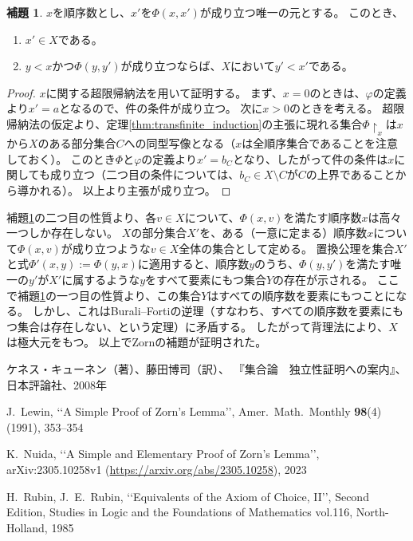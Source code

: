 ﻿\documentclass{ltjsarticle}
\theoremstyle{definition}
\newtheorem{lemma}{補題}
\begin{document}
\begin{lemma}
    \label{lem:appendix_property_of_Phi}
    $x$を順序数とし、$x'$を$\Phi(x,x')$が成り立つ唯一の元とする。
    このとき、
    \begin{enumerate}
        \item $x' \in X$である。
        \item $y < x$かつ$\Phi(y,y')$が成り立つならば、$X$において$y' < x'$である。
    \end{enumerate}
\end{lemma}
\begin{proof}
    $x$に関する超限帰納法を用いて証明する。
    まず、$x = 0$のときは、$\varphi$の定義より$x' = a$となるので、件の条件が成り立つ。
    次に$x > 0$のときを考える。
    超限帰納法の仮定より、定理\ref{thm:transfinite_induction}の主張に現れる集合$\Phi\!\upharpoonright_x$は$x$から$X$のある部分集合$C$への同型写像となる（$x$は全順序集合であることを注意しておく）。
    このとき$\Phi$と$\varphi$の定義より$x' = b_C$となり、したがって件の条件は$x$に関しても成り立つ（二つ目の条件については、$b_C \in X \setminus C$が$C$の上界であることから導かれる）。
    以上より主張が成り立つ。
\end{proof}

補題\ref{lem:appendix_property_of_Phi}の二つ目の性質より、各$v \in X$について、$\Phi(x,v)$を満たす順序数$x$は高々一つしか存在しない。
$X$の部分集合$X'$を、ある（一意に定まる）順序数$x$について$\Phi(x,v)$が成り立つような$v \in X$全体の集合として定める。
置換公理を集合$X'$と式$\Phi'(x,y) := \Phi(y,x)$に適用すると、順序数$y$のうち、$\Phi(y,y')$を満たす唯一の$y'$が$X'$に属するような$y$をすべて要素にもつ集合$Y$の存在が示される。
ここで補題\ref{lem:appendix_property_of_Phi}の一つ目の性質より、この集合$Y$はすべての順序数を要素にもつことになる。
しかし、これはBurali--Fortiの逆理（すなわち、すべての順序数を要素にもつ集合は存在しない、という定理）に矛盾する。
したがって背理法により、$X$は極大元をもつ。
以上でZornの補題が証明された。

\begin{thebibliography}{9}

    ケネス・キューネン（著）、藤田博司（訳）、
    『集合論　独立性証明への案内』、
    日本評論社、2008年

    J.~Lewin,
    \lq\lq A Simple Proof of Zorn's Lemma\rq\rq,
    Amer.\ Math.\ Monthly \textbf{98}(4) (1991),
    353--354

    K.~Nuida,
    \lq\lq A Simple and Elementary Proof of Zorn's Lemma\rq\rq,
    arXiv:2305.10258v1 (\url{https://arxiv.org/abs/2305.10258}), 2023

    H.~Rubin, J.~E.~Rubin, 
    \lq\lq Equivalents of the Axiom of Choice, II\rq\rq, Second Edition, 
    Studies in Logic and the Foundations of Mathematics vol.116, North-Holland, 1985

\end{thebibliography}
\end{document}
